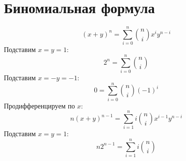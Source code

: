 \section{Биномиальная формула}
\begin{equation}
\left(x+y\right)^n = \sum_{i=0}^n\binom{n}{i}x^iy^{n-i}
\end{equation}
Подставим $x = y = 1$:
\begin{equation}
	2^n = \sum_{i=0}^n\binom{n}{i}
\end{equation}
Подставим $x = -y = -1$:
\begin{equation}
	0 = \sum_{i=0}^n\binom{n}{i}\left(-1\right)^i
\end{equation}
Продифференцируем по $x$:
\[
	n\left(x+y\right)^{n-1} = \sum_{i=1}^ni\binom{n}{i}x^{i-1}y^{n-i}
\]
Подставим $x = y = 1$:
\begin{equation}
	n2^{n-1} = \sum_{i=1}^{n}i\binom{n}{i}
\end{equation}
